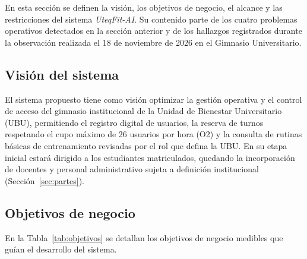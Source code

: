 En esta sección se definen la visión, los objetivos de negocio, el alcance y las restricciones del sistema \textit{UteqFit-AI}. Su contenido parte de los cuatro problemas operativos detectados en la sección anterior y de los hallazgos registrados durante la observación realizada el 18 de noviembre de 2026 en el Gimnasio Universitario.

\subsection{Visión del sistema}
El sistema propuesto tiene como visión optimizar la gestión operativa y el control de acceso del gimnasio institucional de la Unidad de Bienestar Universitario (UBU), permitiendo el registro digital de usuarios, la reserva de turnos respetando el cupo máximo de 26 usuarios por hora (O2) y la consulta de rutinas básicas de entrenamiento revisadas por el rol que defina la UBU. En su etapa inicial estará dirigido a los estudiantes matriculados, quedando la incorporación de docentes y personal administrativo sujeta a definición institucional (Sección~\ref{sec:partes}).

\subsection{Objetivos de negocio}

En la Tabla~\ref{tab:objetivos} se detallan los objetivos de negocio medibles que guían el desarrollo del sistema.

